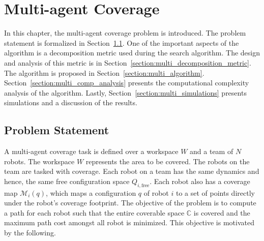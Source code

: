 \documentclass[../main.tex]{subfiles}
\begin{document}
\chapter{Multi-agent Coverage}
\label{chapter:multi_agent_coverage}

In this chapter, the multi-agent coverage problem is introduced. The problem statement is formalized in Section~\ref{section:multi_agent_problem_statement}. One of the important aspects of the algorithm is a decomposition metric used during the search algorithm. The design and analysis of this metric is in Section~\ref{section:multi_decomposition_metric}. The algorithm is proposed in Section~\ref{section:multi_algorithm}. Section~\ref{section:multi_comp_analysis} presents the computational complexity analysis of the algorithm. Lastly, Section~\ref{section:multi_simulations} presents simulations and a discussion of the results.


\section{Problem Statement}
\label{section:multi_agent_problem_statement}


A multi-agent coverage task is defined over a workspace $W$ and a team of $N$ robots. The workspace $W$ represents the area to be covered. The robots on the team are tasked with coverage. Each robot on a team has the same dynamics and hence, the same free configuration space $Q_{i,\text{free}}$. Each robot also has a coverage map $\mathcal{M}_i(q)$, which maps a configuration $q$ of robot $i$ to a set of points directly under the robot's coverage footprint. The objective of the problem is to compute a path for each robot such that the entire coverable space $\mathbb{C}$ is covered and the maximum path cost amongst all robot is minimized. This objective is motivated by the following.
\end{document}
